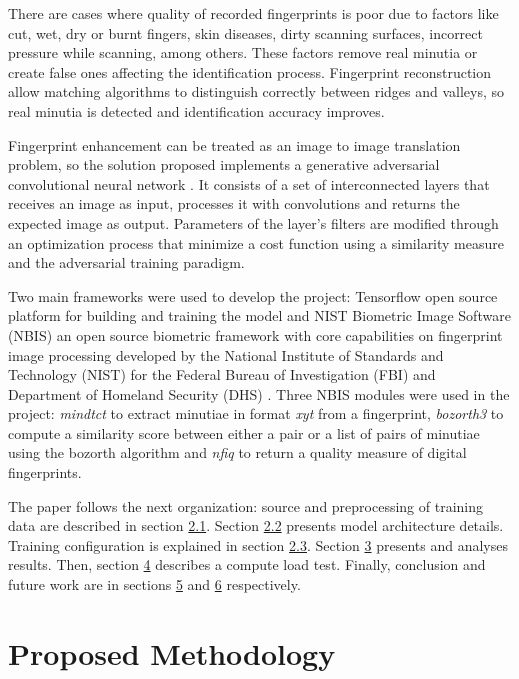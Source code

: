 \documentclass[a4paper,fleqn]{cas-dc}
\begin{document}
There are cases where quality of recorded fingerprints is poor due to factors like cut, wet, dry or burnt fingers, skin diseases, dirty scanning surfaces, incorrect pressure while scanning, among others. These factors remove real minutia or create false ones affecting the identification process. Fingerprint reconstruction allow matching algorithms to distinguish correctly between ridges and valleys, so real minutia is detected and identification accuracy improves.

Fingerprint enhancement can be treated as an image to image translation problem, so the solution proposed implements a generative adversarial convolutional neural network \cite{ITITAN}. It consists of a set of interconnected layers that receives an image as input, processes it with convolutions and returns the expected image as output. Parameters of the layer's filters are modified through an optimization process that minimize a cost function using a similarity measure and the adversarial training paradigm. 

Two main frameworks were used to develop the project: Tensorflow open source platform for building and training the model and NIST Biometric Image Software (NBIS) an open source biometric framework with core capabilities on fingerprint image processing developed by the National Institute of Standards and Technology (NIST) for the Federal Bureau of Investigation (FBI) and Department of Homeland Security (DHS) \cite{NBISWP}. Three NBIS modules were used in the project: \textit{mindtct} to extract minutiae in format \textit{xyt} from a fingerprint, \textit{bozorth3} to compute a similarity score between either a pair or a list of pairs of minutiae using the bozorth algorithm and \textit{nfiq} to return a quality measure of digital fingerprints.

The paper follows the next organization: source and preprocessing of training data are described in section \hyperref[sec:DP]{2.1}. Section \hyperref[sec:MA]{2.2} presents model architecture details. Training configuration is explained in section \hyperref[sec:MT]{2.3}. Section \hyperref[sec:R]{3} presents and analyses results. Then, section \hyperref[sec:CLT]{4} describes a compute load test. Finally, conclusion and future work are in sections \hyperref[sec:FW]{5} and \hyperref[sec:FW]{6} respectively.
     
\section{Proposed Methodology}
\label{sec:PM}
\end{document}
